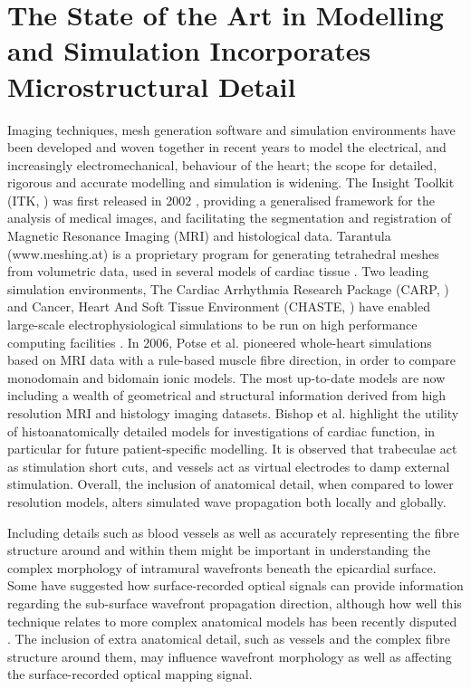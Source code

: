 \section{The State of the Art in Modelling and Simulation Incorporates Microstructural Detail} %
\label{sec:the_state_of_the_art_in_microstructural_modelling_and_simulation_incorporates_microstructural_detail}
  Imaging techniques, mesh generation software and simulation environments have been developed and woven together in recent years to model the electrical, and increasingly electromechanical, behaviour of the heart; the scope for detailed, rigorous and accurate modelling and simulation is widening. The Insight Toolkit (ITK, \cite{Yoo2002}) was first released in 2002 , providing a generalised framework for the analysis of medical images, and facilitating the segmentation and registration of Magnetic Resonance Imaging (MRI) and histological data. Tarantula (www.meshing.at) is a proprietary program for generating tetrahedral meshes from volumetric data, used in several models of cardiac tissue \cite{Bernabeu2008, Bishop2006, Plank2009a}. Two leading simulation environments, The Cardiac Arrhythmia Research Package (CARP, \cite{Vigmond2003}) and Cancer, Heart And Soft Tissue Environment (CHASTE, \cite{Pitt-Francis2008, Pitt-Francis2009, Pitt-Francis2009a}) have enabled large-scale electrophysiological simulations to be run on high performance computing facilities \cite{Bernabeu2008}. In 2006, Potse et al. \cite{Potse2006} pioneered whole-heart simulations based on MRI data with a rule-based muscle fibre direction, in order to compare monodomain and bidomain ionic models. The most up-to-date models \cite{Burton2006, Plank2009} are now including a wealth of geometrical and structural information derived from high resolution MRI and histology imaging datasets. Bishop et al. \cite{Bishop2009a} highlight the utility of histoanatomically detailed models for investigations of cardiac function, in particular for future patient-specific modelling. It is observed that trabeculae act as stimulation short cuts, and vessels act as virtual electrodes to damp external stimulation. Overall, the inclusion of anatomical detail, when compared to lower resolution models, alters simulated wave propagation both locally and globally.

Including details such as blood vessels as well as accurately representing the fibre structure around and within them might be important in understanding the complex morphology of intramural wavefronts beneath the epicardial surface. Some \cite{Ding2001, Hyatt2003} have suggested how surface-recorded optical signals can provide information regarding the sub-surface wavefront propagation direction, although how well this technique relates to more complex anatomical models has been recently disputed  \cite{Bishop2006}. The inclusion of extra anatomical detail, such as vessels and the complex fibre structure around them, may influence wavefront morphology as well as affecting the surface-recorded optical mapping signal.
  
